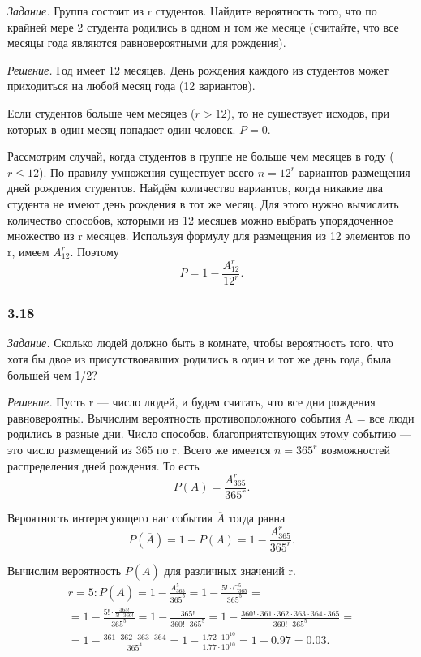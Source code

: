 \documentclass{book}
\begin{document}
\textit{Задание.} Группа состоит из r студентов.
Найдите вероятность того, что по крайней мере 2 студента родились в одном и том же месяце (считайте, что все месяцы года являются равновероятными для рождения).

\textit{Решение.} Год имеет 12 месяцев.
День рождения каждого из студентов может приходиться на любой месяц года (12 вариантов).

Если студентов больше чем месяцев ($ r > 12 $), то не существует исходов, при которых в один месяц попадает один человек.
$ P = 0 $.

Рассмотрим случай, когда студентов в группе не больше чем месяцев в году ($ r \leq 12 $).
По правилу умножения существует всего $ n = 12^r $ вариантов размещения дней рождения студентов.
Найдём количество вариантов, когда никакие два студента не имеют день рождения в тот же месяц.
Для этого нужно вычислить количество способов, которыми из 12 месяцев можно выбрать упорядоченное множество из r месяцев.
Используя формулу для размещения из 12 элементов по r, имеем $ A_{12}^r $.
Поэтому
$$ P =
1 - \frac{ A_{ 12 }^r }{ 12^r }.$$

\subsubsection*{3.18}

\textit{Задание.} Сколько людей должно быть в комнате, чтобы вероятность того, что хотя бы двое из присутствовавших родились в один и тот же день года, была большей чем 1/2?

\textit{Решение.} Пусть r --- число людей, и будем считать, что все дни рождения равновероятны.
Вычислим вероятность противоположного события A = {все люди родились в разные дни}.
Число способов, благоприятствующих этому событию --- это число размещений из 365 по r.
Всего же имеется $ n = 365^r $ возможностей распределения дней рождения.
То есть
$$ P(A) =
\frac{A_{365}^r}{365^r}.$$

Вероятность интересующего нас события $ \overline{A} $ тогда равна
$$ P \left( \overline{A} \right) =
1 - P \left( A \right) =
1 - \frac{A_{365}^r}{365^r}.$$

Вычислим вероятность $ P \left( \overline{A} \right) $ для различных значений r.
\begin{equation*}
\begin{split}
r = 5 : P \left( \overline{A} \right) =
1 - \frac{A_{365}^5}{365^5} =
1 - \frac{5! \cdot C_{365}^5}{365^5} = \\
= 1 - \frac{5! \cdot \frac{365!}{5! \cdot 360!} }{365^5} =
1 - \frac{365!}{360! \cdot 365^5} =
1 - \frac{360! \cdot 361 \cdot 362 \cdot 363 \cdot 364 \cdot 365}{360! \cdot 365^5} = \\
= 1 - \frac{361 \cdot 362 \cdot 363 \cdot 364}{365^4} =
1 - \frac{1.72 \cdot 10^10}{1.77 \cdot 10^10} =
1 - 0.97 =
0.03.
\end{split}
\end{equation*}
\end{document}

